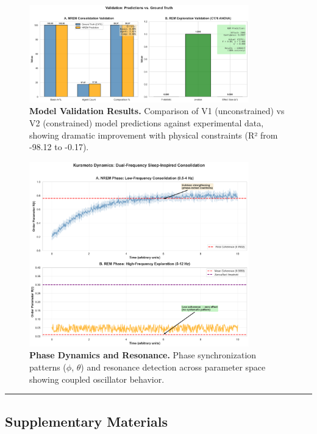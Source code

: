 \documentclass[
]{article}
\begin{document}
\begin{figure}[htbp]
\centering
\includegraphics[width=0.85\textwidth]{figures/paper7_fig3_validation.png}
\caption{\textbf{Model Validation Results.} Comparison of V1 (unconstrained) vs V2 (constrained) model predictions against experimental data, showing dramatic improvement with physical constraints (R² from -98.12 to -0.17).}
\label{fig:validation}
\end{figure}

\begin{figure}[htbp]
\centering
\includegraphics[width=0.85\textwidth]{figures/paper7_fig4_phase_dynamics.png}
\caption{\textbf{Phase Dynamics and Resonance.} Phase synchronization patterns ($\phi$, $\theta$) and resonance detection across parameter space showing coupled oscillator behavior.}
\label{fig:phase}
\end{figure}

\begin{center}\rule{0.5\linewidth}{0.5pt}\end{center}

\subsection{Supplementary Materials}\label{supplementary-materials}
\end{document}

